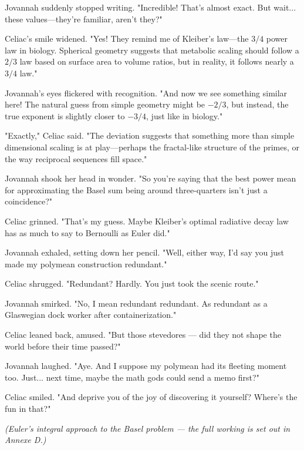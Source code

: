 \smallskip \noindent
Jovannah suddenly stopped writing. "Incredible! That’s almost exact. But wait... these values—they’re familiar, aren’t they?"

\smallskip \noindent
Celiac’s smile widened. "Yes! They remind me of Kleiber’s law—the \( 3/4 \) power law in biology. Spherical geometry suggests that metabolic scaling should follow a \( 2/3 \) law based on surface area to volume ratios, but in reality, it follows nearly a \( 3/4 \) law."

\smallskip \noindent
Jovannah’s eyes flickered with recognition. "And now we see something similar here! The natural guess from simple geometry might be \( -2/3 \), but instead, the true exponent is slightly closer to \( -3/4 \), just like in biology."

\smallskip \noindent
"Exactly," Celiac said. "The deviation suggests that something more than simple dimensional scaling is at play—perhaps the fractal-like structure of the primes, or the way reciprocal sequences fill space."

\smallskip \noindent
Jovannah shook her head in wonder. "So you’re saying that the best power mean for approximating the Basel sum being around three-quarters isn’t just a coincidence?"

\smallskip \noindent
Celiac grinned. "That’s my guess. Maybe Kleiber's optimal radiative decay law has as much to say to Bernoulli as Euler did."

\smallskip \noindent
Jovannah exhaled, setting down her pencil. "Well, either way, I’d say you just made my polymean construction redundant."

\smallskip \noindent
Celiac shrugged. "Redundant? Hardly. You just took the scenic route."

\smallskip \noindent
Jovannah smirked. "No, I mean redundant redundant. As redundant as a Glaswegian dock worker after containerization."

\smallskip \noindent
Celiac leaned back, amused. "But those stevedores — did they not shape the world before their time passed?"

\smallskip \noindent
Jovannah laughed. "Aye. And I suppose my polymean had its fleeting moment too. Just... next time, maybe the math gods could send a memo first?"

\smallskip \noindent
Celiac smiled. "And deprive you of the joy of discovering it yourself? Where’s the fun in that?"


\newpage
\textit{(Euler's integral approach to the Basel problem --- the full working is set out in Annexe D.)}

